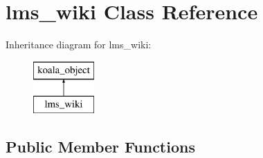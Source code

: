 \hypertarget{classlms__wiki}{
\section{lms\_\-wiki Class Reference}
\label{classlms__wiki}
}
Inheritance diagram for lms\_\-wiki:\begin{figure}[H]
\begin{center}
\leavevmode
\includegraphics[height=2.000000cm]{classlms__wiki}
\end{center}
\end{figure}
\subsection*{Public Member Functions}
